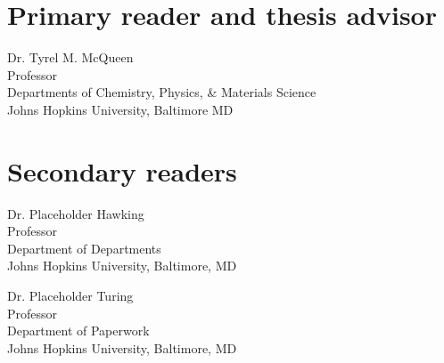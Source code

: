

\Blindtext[3]




\begin{singlespace}

    \section*{Primary reader and thesis advisor}
    
    Dr. Tyrel M. McQueen \\
    Professor\\
    Departments of Chemistry, Physics, & Materials Science\\
    Johns Hopkins University, Baltimore MD 


    \section*{Secondary readers}
    
    Dr. Placeholder Hawking\\
    Professor\\
    Department of Departments \\
    Johns Hopkins University, Baltimore, MD 
    
    \vspace{0.1in}
    
    Dr. Placeholder Turing \\
    Professor\\
    Department of Paperwork \\
    Johns Hopkins University, Baltimore, MD 



\end{singlespace}